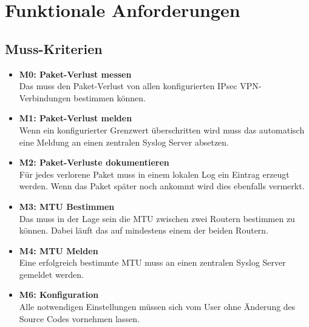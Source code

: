 \section{Funktionale Anforderungen}
\label{sec:Funktionale Anforderungen}

\subsection{Muss-Kriterien}

\begin{itemize}

\item \textbf{M0: Paket-Verlust messen} \\
Das \tool{} muss den Paket-Verlust von allen konfigurierten \ac{IPsec} \ac{VPN}-Verbindungen bestimmen können.

\item \textbf{M1: Paket-Verlust melden} \\
Wenn ein konfigurierter Grenzwert überschritten wird muss das \tool{} automatisch eine Meldung an einen zentralen Syslog Server absetzen.

\item \textbf{M2: Paket-Verluste dokumentieren} \\
Für jedes verlorene Paket muss in einem lokalen Log ein Eintrag erzeugt werden. Wenn das Paket später noch ankommt wird dies ebenfalls vermerkt.

\item \textbf{M3: MTU Bestimmen} \\
Das \tool{} muss in der Lage sein die \ac{MTU} zwischen zwei Routern bestimmen zu können. Dabei läuft das \tool{} auf mindestens einem der beiden Routern.

\item \textbf{M4: MTU Melden} \\
Eine erfolgreich bestimmte \ac{MTU} muss an einen zentralen Syslog Server gemeldet werden.

\item \textbf{M6: Konfiguration} \\
Alle notwendigen Einstellungen müssen sich vom User ohne Änderung des Source Codes vornehmen lassen.

\end{itemize}

